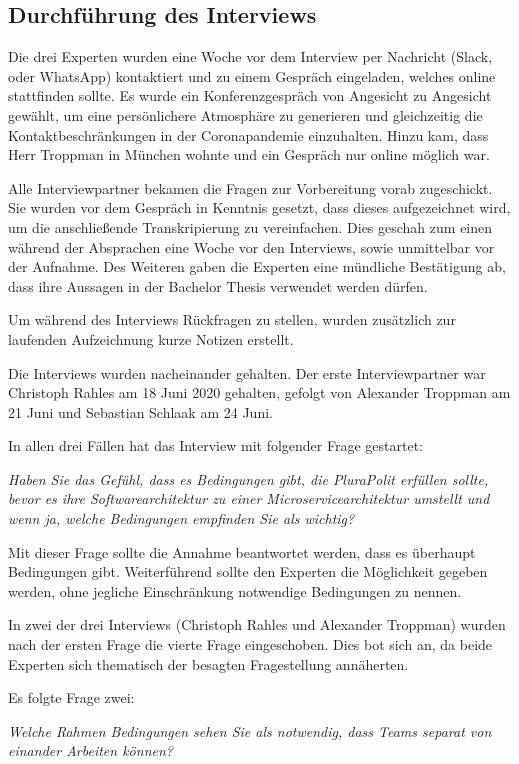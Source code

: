 \subsection{Durchführung des Interviews}

Die drei Experten wurden eine Woche vor dem Interview per Nachricht (Slack, oder WhatsApp) kontaktiert und zu einem Gespräch eingeladen, welches online stattfinden sollte. Es wurde ein Konferenzgespräch von Angesicht zu Angesicht gewählt, um eine persönlichere Atmosphäre zu generieren und gleichzeitig die Kontaktbeschränkungen in der Coronapandemie einzuhalten. Hinzu kam, dass Herr Troppman in München wohnte und ein Gespräch nur online möglich war.

Alle Interviewpartner bekamen die Fragen zur Vorbereitung vorab zugeschickt. Sie wurden vor dem Gespräch in Kenntnis gesetzt, dass dieses aufgezeichnet wird, um die anschließende Transkripierung zu vereinfachen. Dies geschah zum einen während der Absprachen eine Woche vor den Interviews, sowie unmittelbar vor der Aufnahme. Des Weiteren gaben die Experten eine mündliche Bestätigung ab, dass ihre Aussagen in der Bachelor Thesis verwendet werden dürfen.

Um während des Interviews Rückfragen zu stellen, wurden zusätzlich zur laufenden Aufzeichnung kurze Notizen erstellt.

Die Interviews wurden nacheinander gehalten. Der erste Interviewpartner war Christoph Rahles am 18 Juni 2020 gehalten, gefolgt von Alexander Troppman am 21 Juni und Sebastian Schlaak am 24 Juni.

In allen drei Fällen hat das Interview mit folgender Frage gestartet:

\textit{Haben Sie das Gefühl, dass es Bedingungen gibt, die PluraPolit erfüllen sollte, bevor es ihre Softwarearchitektur zu einer Microservicearchitektur umstellt und wenn ja, welche Bedingungen empfinden Sie als wichtig?}

Mit dieser Frage sollte die Annahme beantwortet werden, dass es überhaupt Bedingungen gibt. Weiterführend sollte den Experten die Möglichkeit gegeben werden, ohne jegliche Einschränkung notwendige Bedingungen zu nennen.

In zwei der drei Interviews (Christoph Rahles und Alexander Troppman) wurden nach der ersten Frage die vierte Frage eingeschoben. Dies bot sich an, da beide Experten sich thematisch der besagten Fragestellung annäherten.

Es folgte Frage zwei:

\textit{Welche Rahmen Bedingungen sehen Sie als notwendig, dass Teams separat von einander Arbeiten können?}

